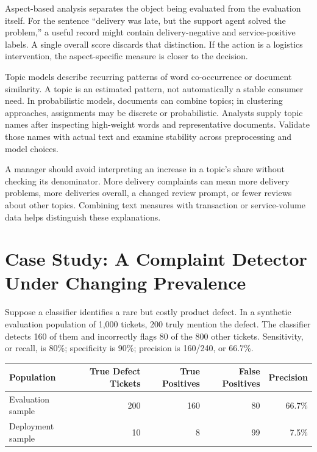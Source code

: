 Aspect-based analysis separates the object being evaluated from the
evaluation itself. For the sentence ``delivery was late, but the support
agent solved the problem,'' a useful record might contain
delivery-negative and service-positive labels. A single overall score
discards that distinction. If the action is a logistics intervention,
the aspect-specific measure is closer to the decision.

Topic models describe recurring patterns of word co-occurrence or
document similarity. A topic is an estimated pattern, not automatically
a stable consumer need. In probabilistic models, documents can combine
topics; in clustering approaches, assignments may be discrete or
probabilistic. Analysts supply topic names after inspecting high-weight
words and representative documents. Validate those names with actual
text and examine stability across preprocessing and model choices.

A manager should avoid interpreting an increase in a topic's share
without checking its denominator. More delivery complaints can mean more
delivery problems, more deliveries overall, a changed review prompt, or
fewer reviews about other topics. Combining text measures with
transaction or service-volume data helps distinguish these explanations.

\hypertarget{M05-case-study-a-complaint-detector-under-changing-prevalence}{%
\section{Case Study: A Complaint Detector Under Changing
Prevalence}\label{M05-case-study-a-complaint-detector-under-changing-prevalence}}

\noindent Suppose a classifier identifies a rare but costly product defect. In a
synthetic evaluation population of 1,000 tickets, 200 truly mention the
defect. The classifier detects 160 of them and incorrectly flags 80 of
the 800 other tickets. Sensitivity, or recall, is 80\%; specificity is
90\%; precision is 160/240, or 66.7\%.

\begin{table}[H]
\centering\small
\begin{tabular}{@{}lrrrr@{}}
\toprule
Population & True Defect Tickets & True Positives & False Positives &
Precision \\
\midrule

Evaluation sample & 200 & 160 & 80 & 66.7\% \\
Deployment sample & 10 & 8 & 99 & 7.5\% \\
\bottomrule
\end{tabular}
\end{table}

